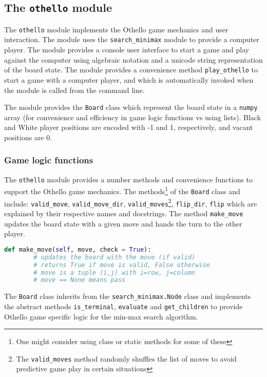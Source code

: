 \documentclass[a4paper]{article}
\begin{document}
\subsection{The \texttt{othello} module}

The \texttt{othello} module implements the Othello game mechanics and user interaction. The module uses the \texttt{search\_minimax} module to provide a computer player. The module provides a console user interface to start a game and play against the computer using algebraic notation and a unicode string representation of the board state. The module provides a convenience method \texttt{play\_othello} to start a game with a computer player, and which is automatically invoked when the module is called from the command line. 

The module provides the \texttt{Board} class which represent the board state in a \texttt{numpy} array (for convenience and efficiency in game logic functions vs using lists). Black and White player positions are encoded with -1 and 1, respectively, and vacant positions are 0.

\subsubsection{Game logic functions}
The \texttt{othello} module provides a number methods and convenience functions to support the Othello game mechanics. The methods\footnote{One might consider using class or static methods for some of these} of the \texttt{Board} class and include: \texttt{valid\_move}, \texttt{valid\_move\_dir}, \texttt{valid\_moves}\footnote{The \texttt{valid\_moves} method randomly shuffles the list of moves to avoid predictive game play in certain situations}, \texttt{flip\_dir}, \texttt{flip} which are explained by their respective names and docstrings. The method \texttt{make\_move} updates the board state with a given move and hands the turn to the other player.
\begin{lstlisting}[language=Python]
    def make_move(self, move, check = True):
        # updates the board with the move (if valid)
        # returns True if move is valid, False otherwise
        # move is a tuple (i,j) with i=row, j=column
        # move == None means pass
\end{lstlisting}


The \texttt{Board} class inherits from the \texttt{search\_minimax.Node} class and implements the abstract methods \texttt{is\_terminal}, \texttt{evaluate} and \texttt{get\_children} to provide Othello game specific logic for the min-max search algorithm. 
\end{document}
